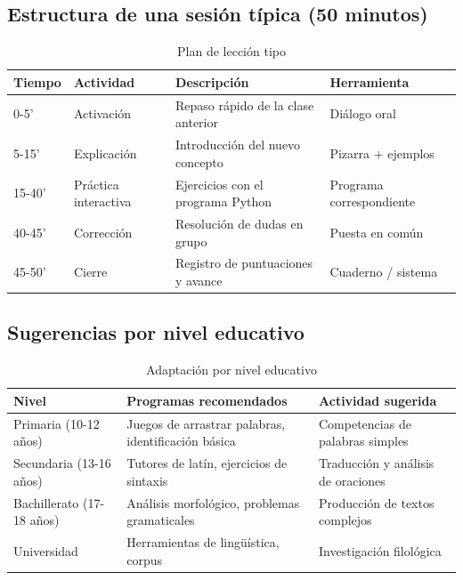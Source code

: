 \documentclass[12pt,spanish]{article}
\begin{document}
\subsection{Estructura de una sesión típica (50 minutos)}

\begin{table}[H]
\centering
\caption{Plan de lección tipo}
\label{tab:sesion}
\begin{tabular}{|p{2.5cm}|p{4cm}|p{5cm}|p{2.5cm}|}
\hline
\textbf{Tiempo} & \textbf{Actividad} & \textbf{Descripción} & \textbf{Herramienta} \\
\hline
0-5' & Activación & Repaso rápido de la clase anterior & Diálogo oral \\
\hline
5-15' & Explicación & Introducción del nuevo concepto & Pizarra + ejemplos \\
\hline
15-40' & Práctica interactiva & Ejercicios con el programa Python & Programa correspondiente \\
\hline
40-45' & Corrección & Resolución de dudas en grupo & Puesta en común \\
\hline
45-50' & Cierre & Registro de puntuaciones y avance & Cuaderno / sistema \\
\hline
\end{tabular}
\end{table}

\subsection{Sugerencias por nivel educativo}

\begin{table}[H]
\centering
\caption{Adaptación por nivel educativo}
\label{tab:niveles}
\begin{tabular}{|p{3cm}|p{5cm}|p{6cm}|}
\hline
\textbf{Nivel} & \textbf{Programas recomendados} & \textbf{Actividad sugerida} \\
\hline
Primaria (10-12 años) & Juegos de arrastrar palabras, identificación básica & Competencias de palabras simples \\
\hline
Secundaria (13-16 años) & Tutores de latín, ejercicios de sintaxis & Traducción y análisis de oraciones \\
\hline
Bachillerato (17-18 años) & Análisis morfológico, problemas gramaticales & Producción de textos complejos \\
\hline
Universidad & Herramientas de lingüística, corpus & Investigación filológica \\
\hline
\end{tabular}
\end{table}
\end{document}
